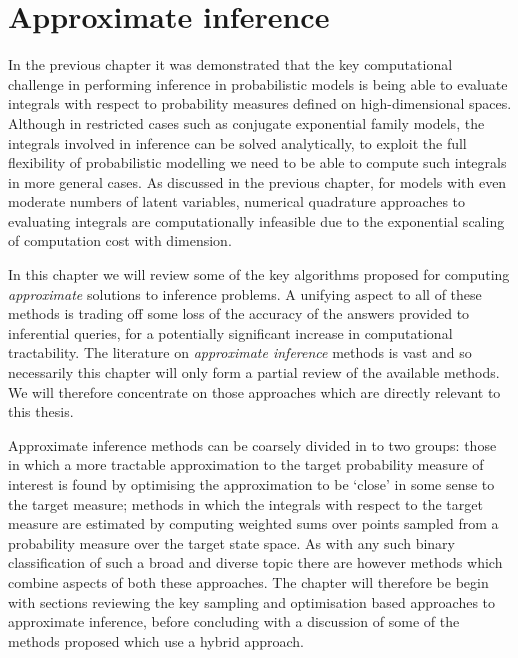\chapter{Approximate inference}\label{ch:approximate-inference}

In the previous chapter it was demonstrated that the key computational challenge in performing inference in probabilistic models is being able to evaluate integrals with respect to probability measures defined on high-dimensional spaces. Although in restricted cases such as conjugate exponential family models, the integrals involved in inference can be solved analytically, to exploit the full flexibility of probabilistic modelling we need to be able to compute such integrals in more general cases. As discussed in the previous chapter, for models with even moderate numbers of latent variables, numerical quadrature approaches to evaluating integrals are computationally infeasible due to the exponential scaling of computation cost with dimension.

In this chapter we will review some of the key algorithms proposed for computing \emph{approximate} solutions to inference problems. A unifying aspect to all of these methods is trading off some loss of the accuracy of the answers provided to inferential queries, for a potentially significant increase in computational tractability. The literature on \emph{approximate inference} methods is vast and so necessarily this chapter will only form a partial review of the available methods. We will therefore concentrate on those approaches which are directly relevant to this thesis.

Approximate inference methods can be coarsely divided in to two groups: those in which a more tractable approximation to the target probability measure of interest is found by optimising the approximation to be `close' in some sense to the target measure; methods in which the integrals with respect to the target measure are estimated by computing weighted sums over points sampled from a probability measure over the target state space. As with any such binary classification of such a broad and diverse topic there are however methods which combine aspects of both these approaches. The chapter will therefore be begin with sections reviewing the key sampling and optimisation based approaches to approximate inference, before concluding with a discussion of some of the methods proposed which use a hybrid approach.

